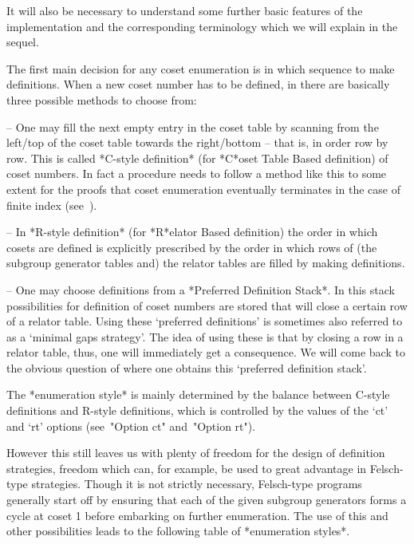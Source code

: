 \endlist

It will also be necessary to understand some further basic features of
the  implementation and  the corresponding  terminology which  we will
explain in the sequel.


The first main decision for any coset enumeration is in which sequence
to make definitions. When a new coset number has  to  be  defined,  in
{\ACE} there are basically three possible methods to choose from:

\beginlist

\item{--} One may fill the next empty entry  in  the  coset  table  by
scanning from the left/top of the coset table towards the right/bottom
-- that is, in order row by row. This is called  *C-style  definition*
(for *C*oset Table Based definition)  of  coset  numbers.  In  fact  a
procedure needs to follow a method like this to some  extent  for  the
proofs that coset enumeration eventually terminates  in  the  case  of
finite index (see~\cite{Neu82}).

\item{--} In *R-style definition* (for *R*elator Based definition) the
order  in which  cosets are  defined is  explicitly prescribed  by the
order in which rows of (the subgroup generator tables and) the relator
tables are filled by making definitions.

\item{--} One may choose  definitions  from  a  *Preferred  Definition
Stack*. In this stack possibilities for definition  of  coset  numbers
are stored that will close a certain row of  a  relator  table.  Using
these \lq{}preferred definitions' is sometimes also referred to  as  a
\lq{}minimal gaps strategy'. The  idea  of  using  these  is  that  by
closing a row in a relator table, thus, one  will  immediately  get  a
consequence. We will come back to the obvious question  of  where  one
obtains this \lq{}preferred definition stack'.

\endlist

The *enumeration style* is mainly determined by  the  balance  between
C-style definitions and R-style definitions, which  is  controlled  by
the values of the `ct' and `rt' options (see~"Option  ct"  and~"Option
rt").

However this still leaves us with  plenty of freedom for the design of
definition  strategies,  freedom which  can, for example,  be  used to
great advantage in Felsch-type strategies. Though it is  not  strictly
necessary, Felsch-type  programs generally start off  by ensuring that
each of the given subgroup generators  forms a cycle at coset 1 before
embarking  on   further  enumeration.  The  use  of   this  and  other
possibilities leads to the following table of *enumeration styles*.



